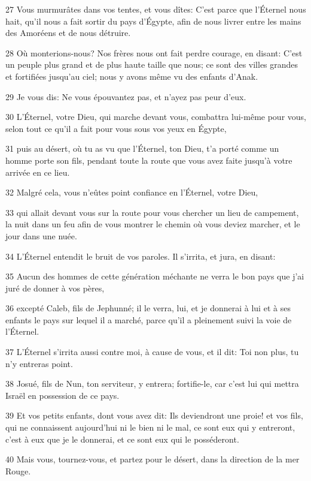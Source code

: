 \par 27 Vous murmurâtes dans vos tentes, et vous dîtes: C'est parce que l'Éternel nous hait, qu'il nous a fait sortir du pays d'Égypte, afin de nous livrer entre les mains des Amoréens et de nous détruire.
\par 28 Où monterions-nous? Nos frères nous ont fait perdre courage, en disant: C'est un peuple plus grand et de plus haute taille que nous; ce sont des villes grandes et fortifiées jusqu'au ciel; nous y avons même vu des enfants d'Anak.
\par 29 Je vous dis: Ne vous épouvantez pas, et n'ayez pas peur d'eux.
\par 30 L'Éternel, votre Dieu, qui marche devant vous, combattra lui-même pour vous, selon tout ce qu'il a fait pour vous sous vos yeux en Égypte,
\par 31 puis au désert, où tu as vu que l'Éternel, ton Dieu, t'a porté comme un homme porte son fils, pendant toute la route que vous avez faite jusqu'à votre arrivée en ce lieu.
\par 32 Malgré cela, vous n'eûtes point confiance en l'Éternel, votre Dieu,
\par 33 qui allait devant vous sur la route pour vous chercher un lieu de campement, la nuit dans un feu afin de vous montrer le chemin où vous deviez marcher, et le jour dans une nuée.
\par 34 L'Éternel entendit le bruit de vos paroles. Il s'irrita, et jura, en disant:
\par 35 Aucun des hommes de cette génération méchante ne verra le bon pays que j'ai juré de donner à vos pères,
\par 36 excepté Caleb, fils de Jephunné; il le verra, lui, et je donnerai à lui et à ses enfants le pays sur lequel il a marché, parce qu'il a pleinement suivi la voie de l'Éternel.
\par 37 L'Éternel s'irrita aussi contre moi, à cause de vous, et il dit: Toi non plus, tu n'y entreras point.
\par 38 Josué, fils de Nun, ton serviteur, y entrera; fortifie-le, car c'est lui qui mettra Israël en possession de ce pays.
\par 39 Et vos petits enfants, dont vous avez dit: Ils deviendront une proie! et vos fils, qui ne connaissent aujourd'hui ni le bien ni le mal, ce sont eux qui y entreront, c'est à eux que je le donnerai, et ce sont eux qui le posséderont.
\par 40 Mais vous, tournez-vous, et partez pour le désert, dans la direction de la mer Rouge.

